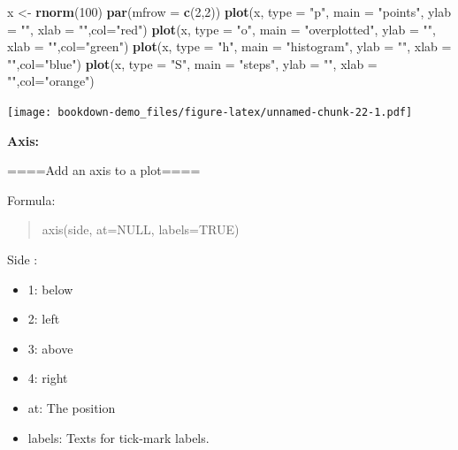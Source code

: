 \documentclass[]{book}
\newenvironment{Shaded}{\begin{snugshade}}{\end{snugshade}}
\newcommand{\KeywordTok}[1]{\textcolor[rgb]{0.13,0.29,0.53}{\textbf{#1}}}
\newcommand{\DataTypeTok}[1]{\textcolor[rgb]{0.13,0.29,0.53}{#1}}
\newcommand{\DecValTok}[1]{\textcolor[rgb]{0.00,0.00,0.81}{#1}}
\newcommand{\StringTok}[1]{\textcolor[rgb]{0.31,0.60,0.02}{#1}}
\newcommand{\NormalTok}[1]{#1}
\begin{document}
\begin{Shaded}
\begin{Highlighting}[]
\NormalTok{x <-}\StringTok{ }\KeywordTok{rnorm}\NormalTok{(}\DecValTok{100}\NormalTok{) }
\KeywordTok{par}\NormalTok{(}\DataTypeTok{mfrow =} \KeywordTok{c}\NormalTok{(}\DecValTok{2}\NormalTok{,}\DecValTok{2}\NormalTok{))}
\KeywordTok{plot}\NormalTok{(x, }\DataTypeTok{type =} \StringTok{"p"}\NormalTok{, }\DataTypeTok{main =} \StringTok{"points"}\NormalTok{, }\DataTypeTok{ylab =} \StringTok{""}\NormalTok{, }\DataTypeTok{xlab =} \StringTok{""}\NormalTok{,}\DataTypeTok{col=}\StringTok{"red"}\NormalTok{)}
\KeywordTok{plot}\NormalTok{(x, }\DataTypeTok{type =} \StringTok{"o"}\NormalTok{, }\DataTypeTok{main =} \StringTok{"overplotted"}\NormalTok{, }\DataTypeTok{ylab =} \StringTok{""}\NormalTok{, }\DataTypeTok{xlab =} \StringTok{""}\NormalTok{,}\DataTypeTok{col=}\StringTok{"green"}\NormalTok{)}
\KeywordTok{plot}\NormalTok{(x, }\DataTypeTok{type =} \StringTok{"h"}\NormalTok{, }\DataTypeTok{main =} \StringTok{"histogram"}\NormalTok{, }\DataTypeTok{ylab =} \StringTok{""}\NormalTok{, }\DataTypeTok{xlab =} \StringTok{""}\NormalTok{,}\DataTypeTok{col=}\StringTok{"blue"}\NormalTok{)}
\KeywordTok{plot}\NormalTok{(x, }\DataTypeTok{type =} \StringTok{"S"}\NormalTok{, }\DataTypeTok{main =} \StringTok{"steps"}\NormalTok{, }\DataTypeTok{ylab =} \StringTok{""}\NormalTok{, }\DataTypeTok{xlab =} \StringTok{""}\NormalTok{,}\DataTypeTok{col=}\StringTok{"orange"}\NormalTok{)}
\end{Highlighting}
\end{Shaded}

\texttt{[image: bookdown-demo\_files/figure-latex/unnamed-chunk-22-1.pdf]}

\textbf{Axis: }

====Add an axis to a plot====

Formula:

\begin{quote}
axis(side, at=NULL, labels=TRUE)
\end{quote}

Side :

\begin{itemize}
\item
  1: below
\item
  2: left
\item
  3: above
\item
  4: right
\item
  at: The position
\item
  labels: Texts for tick-mark labels.
\end{itemize}
\end{document}
